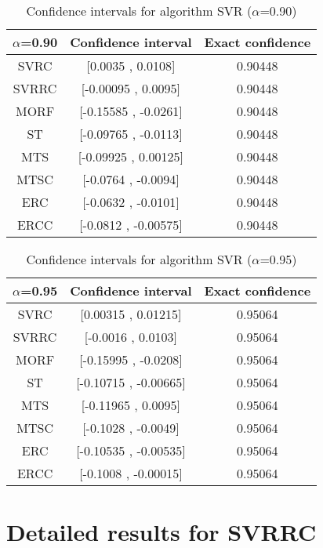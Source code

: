 \documentclass[a4paper,10pt]{article}
\begin{document}
\begin{table}[!htp]
\centering\small
\begin{tabular}{
|c|c|c|}
\hline
 $\alpha$=0.90 & Confidence interval & Exact confidence \\ \hline 
SVRC & [0.0035 , 0.0108] & 0.90448\\ \hline 
SVRRC & [-0.00095 , 0.0095] & 0.90448\\ \hline 
MORF & [-0.15585 , -0.0261] & 0.90448\\ \hline 
ST & [-0.09765 , -0.0113] & 0.90448\\ \hline 
MTS & [-0.09925 , 0.00125] & 0.90448\\ \hline 
MTSC & [-0.0764 , -0.0094] & 0.90448\\ \hline 
ERC & [-0.0632 , -0.0101] & 0.90448\\ \hline 
ERCC & [-0.0812 , -0.00575] & 0.90448\\ \hline 

\end{tabular}
\caption{Confidence intervals for algorithm SVR ($\alpha$=0.90)}
\end{table}
\begin{table}[!htp]
\centering\small
\begin{tabular}{
|c|c|c|}
\hline
 $\alpha$=0.95 & Confidence interval & Exact confidence \\ \hline 
SVRC & [0.00315 , 0.01215] & 0.95064\\ \hline 
SVRRC & [-0.0016 , 0.0103] & 0.95064\\ \hline 
MORF & [-0.15995 , -0.0208] & 0.95064\\ \hline 
ST & [-0.10715 , -0.00665] & 0.95064\\ \hline 
MTS & [-0.11965 , 0.0095] & 0.95064\\ \hline 
MTSC & [-0.1028 , -0.0049] & 0.95064\\ \hline 
ERC & [-0.10535 , -0.00535] & 0.95064\\ \hline 
ERCC & [-0.1008 , -0.00015] & 0.95064\\ \hline 

\end{tabular}
\caption{Confidence intervals for algorithm SVR ($\alpha$=0.95)}
\end{table}

 \clearpage 


\section{Detailed results for SVRRC}
\end{document}
